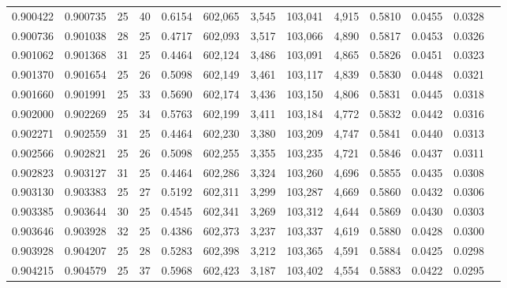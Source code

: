\begin{tabular}{rrrrrrrrrrrrr}
0.900422 & 0.900735 &    25 &  40 &                                     0.6154 & 602,065 &   3,545 & 103,041 &   4,915 & 0.5810 & 0.0455 & 0.0328 \\
0.900736 & 0.901038 &    28 &  25 &                                     0.4717 & 602,093 &   3,517 & 103,066 &   4,890 & 0.5817 & 0.0453 & 0.0326 \\
0.901062 & 0.901368 &    31 &  25 &                                     0.4464 & 602,124 &   3,486 & 103,091 &   4,865 & 0.5826 & 0.0451 & 0.0323 \\
0.901370 & 0.901654 &    25 &  26 &                                     0.5098 & 602,149 &   3,461 & 103,117 &   4,839 & 0.5830 & 0.0448 & 0.0321 \\
0.901660 & 0.901991 &    25 &  33 &                                     0.5690 & 602,174 &   3,436 & 103,150 &   4,806 & 0.5831 & 0.0445 & 0.0318 \\
0.902000 & 0.902269 &    25 &  34 &                                     0.5763 & 602,199 &   3,411 & 103,184 &   4,772 & 0.5832 & 0.0442 & 0.0316 \\
0.902271 & 0.902559 &    31 &  25 &                                     0.4464 & 602,230 &   3,380 & 103,209 &   4,747 & 0.5841 & 0.0440 & 0.0313 \\
0.902566 & 0.902821 &    25 &  26 &                                     0.5098 & 602,255 &   3,355 & 103,235 &   4,721 & 0.5846 & 0.0437 & 0.0311 \\
0.902823 & 0.903127 &    31 &  25 &                                     0.4464 & 602,286 &   3,324 & 103,260 &   4,696 & 0.5855 & 0.0435 & 0.0308 \\
0.903130 & 0.903383 &    25 &  27 &                                     0.5192 & 602,311 &   3,299 & 103,287 &   4,669 & 0.5860 & 0.0432 & 0.0306 \\
0.903385 & 0.903644 &    30 &  25 &                                     0.4545 & 602,341 &   3,269 & 103,312 &   4,644 & 0.5869 & 0.0430 & 0.0303 \\
0.903646 & 0.903928 &    32 &  25 &                                     0.4386 & 602,373 &   3,237 & 103,337 &   4,619 & 0.5880 & 0.0428 & 0.0300 \\
0.903928 & 0.904207 &    25 &  28 &                                     0.5283 & 602,398 &   3,212 & 103,365 &   4,591 & 0.5884 & 0.0425 & 0.0298 \\
0.904215 & 0.904579 &    25 &  37 &                                     0.5968 & 602,423 &   3,187 & 103,402 &   4,554 & 0.5883 & 0.0422 & 0.0295 \\

\end{tabular}
